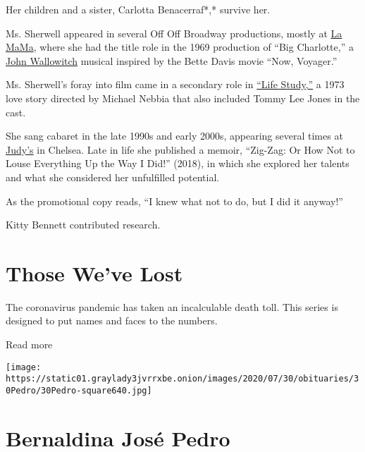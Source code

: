 Her children and a sister, Carlotta Benacerraf*,* survive her.

Ms. Sherwell appeared in several Off Off Broadway productions, mostly at
\href{http://lamama.org/}{La MaMa}, where she had the title role in the
1969 production of ``Big Charlotte,'' a
\href{https://www.nytimes3xbfgragh.onion/2007/08/16/arts/music/16wallowitch.html}{John
Wallowitch} musical inspired by the Bette Davis movie ``Now, Voyager.''

Ms. Sherwell's foray into film came in a secondary role in
\href{https://www.nytimes3xbfgragh.onion/1973/01/26/archives/life-studyscreen-love-story-is-all-too-vulnerable.html}{``Life
Study,''} a 1973 love story directed by Michael Nebbia that also
included Tommy Lee Jones in the cast.

She sang cabaret in the late 1990s and early 2000s, appearing several
times at
\href{https://www.nytimes3xbfgragh.onion/2009/12/31/arts/music/31kreston.html}{Judy's}
in Chelsea. Late in life she published a memoir, ``Zig-Zag: Or How Not
to Louse Everything Up the Way I Did!'' (2018), in which she explored
her talents and what she considered her unfulfilled potential.

As the promotional copy reads, ``I knew what not to do, but I did it
anyway!''

Kitty Bennett contributed research.

\href{https://www.nytimes3xbfgragh.onion/interactive/2020/obituaries/people-died-coronavirus-obituaries.html?action=click\&pgtype=Article\&state=default\&region=BELOW_MAIN_CONTENT\&context=covid_obits_promo}{}

\hypertarget{those-weve-lost}{%
\section{Those We've Lost}\label{those-weve-lost}}

The coronavirus pandemic has taken an incalculable death toll. This
series is designed to put names and faces to the numbers.

Read more

\texttt{[image: https://static01.graylady3jvrrxbe.onion/images/2020/07/30/obituaries/30Pedro/30Pedro-square640.jpg]}

\hypertarget{bernaldina-josuxe9-pedro}{%
\section{Bernaldina José Pedro}\label{bernaldina-josuxe9-pedro}}


